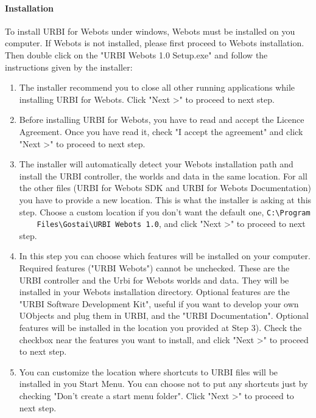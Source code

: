 \paragraph{Installation}
\label{webots.setup.windows.installation}%

To install URBI for Webots under windows, Webots must be installed on
you computer. If Webots is not installed, please first proceed to
Webots installation. Then double click on the "URBI Webots 1.0
Setup.exe" and follow the instructions given by the installer:

\begin{enumerate}

\item The installer recommend you to close all other running
  applications while installing URBI for Webots. Click "Next >{}" to
  proceed to next step.

\item Before installing URBI for Webots, you have to read and accept
  the Licence Agreement. Once you have read it, check "I accept the
  agreement" and click "Next >{}" to proceed to next step.

\item The installer will automatically detect your Webots installation
  path and install the URBI controller, the worlds and data in the
  same location. For all the other files (URBI for Webots SDK and URBI
  for Webots Documentation) you have to provide a new location. This
  is what the installer is asking at this step. Choose a custom
  location if you don't want the default one, \nolinkurl{C:\Program
    Files\Gostai\URBI Webots 1.0}, and click "Next >{}" to proceed to
  next step.

\item In this step you can choose which features will be installed on
  your computer. Required features ("URBI Webots") cannot be
  unchecked. These are the URBI controller and the Urbi for Webots
  worlds and data. They will be installed in your Webots installation
  directory. Optional features are the "URBI Software Development
  Kit", useful if you want to develop your own UObjects and plug them
  in URBI, and the "URBI Documentation". Optional features will be
  installed in the location you provided at Step 3).  Check the
  checkbox near the features you want to install, and click "Next >{}"
  to proceed to next step.

\item You can customize the location where shortcuts to URBI files
  will be installed in you Start Menu. You can choose not to put any
  shortcuts just by checking "Don't create a start menu folder". Click
  "Next >{}" to proceed to next step.


\end{enumerate}
